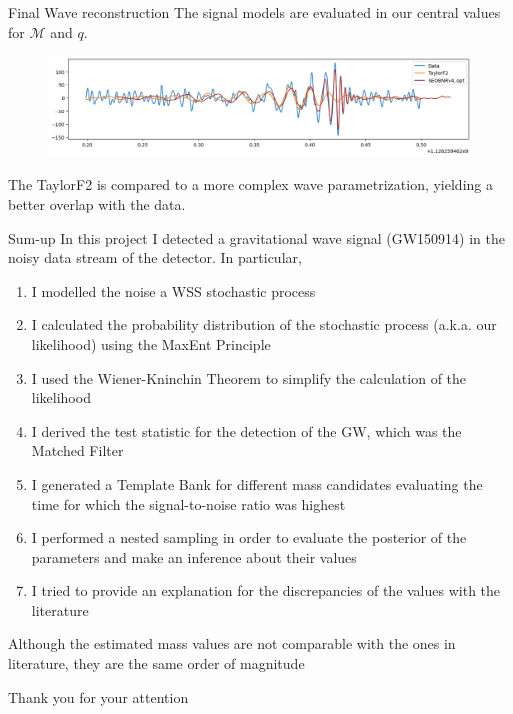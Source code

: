 \documentclass[
10pt,
aspectratio=169,
]{beamer}
\begin{document}
\begin{frame}{Final Wave reconstruction}
The signal models are evaluated in our central values for $\mathcal{M}$ and $q$. 
\vfill
    \begin{figure}
        \centering
        \includegraphics[width=\textwidth]{def_def_gw.png}
    \end{figure}
    \vfill
    The TaylorF2 is compared to a more complex wave parametrization, yielding a better overlap with the data.
\end{frame}
\begin{frame}{Sum-up}
 In this project I detected a gravitational wave signal (GW150914) in the noisy data stream of the detector. In particular,
\begin{enumerate}
    \item I modelled the noise a WSS stochastic process
    \item I calculated the probability distribution of the stochastic process (a.k.a. our likelihood) using the MaxEnt Principle
    \item I used the Wiener-Kninchin Theorem to simplify the calculation of the likelihood
    \item I derived the test statistic for the detection of the GW, which was the Matched Filter
    \item I generated a Template Bank for different mass candidates evaluating the time for which the signal-to-noise ratio was highest
    \item I performed a nested sampling in order to evaluate the posterior of the parameters and make an inference about their values
    \item I tried to provide an explanation for the discrepancies of the values with the literature
\end{enumerate}
    Although the estimated mass values are not comparable with the ones in literature, they are the same order of magnitude
\end{frame}
\begin{frame}[plain]
	\vfill
	\centering
	{
		\centering \Huge \color{white} Thank you for your attention%
	}
	\vfill
\end{frame}
\end{document}
